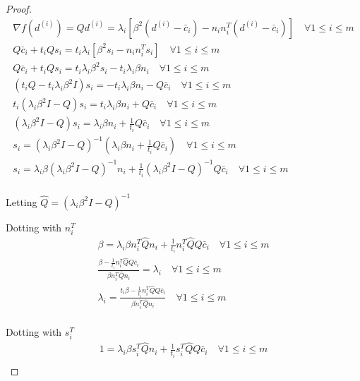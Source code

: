 \begin{proof}
\vspace{10cm}





\begin{align*}
\nabla f(d^{(i)}) = Q d^{(i)} = \lambda_i \left[ \beta^2(d^{(i)} - \bar c_i) - n_in_i^T(d^{(i)} - \bar c_i) \right]\quad \forall 1\le i\le m \\
Q \bar c_i + t_i Q s_i = t_i \lambda_i \left[ \beta^2s_i - n_in_i^Ts_i \right]\quad \forall 1\le i\le m \\
Q \bar c_i + t_i Q s_i = t_i \lambda_i\beta^2s_i - t_i \lambda_i\beta n_i \quad \forall 1\le i\le m \\
\left(t_i Q - t_i \lambda_i\beta^2I \right) s_i = - t_i \lambda_i\beta n_i - Q \bar c_i \quad \forall 1\le i\le m \\
t_i\left(\lambda_i\beta^2I - Q \right) s_i = t_i \lambda_i\beta n_i + Q \bar c_i \quad \forall 1\le i\le m \\
\left(\lambda_i\beta^2I - Q \right) s_i = \lambda_i\beta n_i + \frac 1 { t_i} Q \bar c_i \quad \forall 1\le i\le m \\
s_i = \left(\lambda_i\beta^2I - Q \right)^{-1}\left(\lambda_i\beta n_i + \frac 1 { t_i} Q \bar c_i\right) \quad \forall 1\le i\le m \\
s_i = \lambda_i\beta \left(\lambda_i\beta^2I - Q \right)^{-1}n_i + \frac 1 { t_i} \left(\lambda_i\beta^2I - Q \right)^{-1}Q \bar c_i \quad \forall 1\le i\le m \\
\end{align*}

Letting $\hat Q = \left(\lambda_i\beta^2I - Q \right)^{-1}$

Dotting with $n_i^T$
\begin{align*}
\beta = \lambda_i\beta n_i^T\hat Q n_i + \frac 1 { t_i} n_i^T\hat Q Q \bar c_i\quad \forall 1\le i\le m \\
\frac{\beta - \frac 1 { t_i} n_i^T\hat Q Q \bar c_i }{\beta n_i^T\hat Q n_i} = \lambda_i \quad \forall 1\le i\le m \\
\lambda_i = \frac{t_i \beta - \frac 1 { t_i} n_i^T\hat Q Q \bar c_i }{\beta n_i^T\hat Q n_i} \quad \forall 1\le i\le m \\
\end{align*}


Dotting with $s_i^T$
\begin{align*}
1 = \lambda_i\beta s_i^T\hat Q n_i + \frac 1 { t_i} s_i^T\hat Q Q \bar c_i\quad \forall 1\le i\le m \\
\end{align*}



\end{proof}
